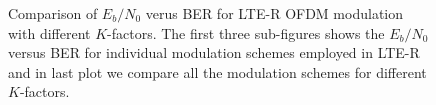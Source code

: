 \begin{figure}[t!]
  \begin{center}
  \hspace{1mm}
   \hspace{1mm}
  \hspace{1mm}
   \hspace{1mm}
     \caption{Comparison of $E_b/N_0$ verus BER for LTE-R OFDM modulation with different $K$-factors. The first three sub-figures shows the $E_b/N_0$ versus BER for individual modulation schemes employed in LTE-R and in last plot we compare all the modulation schemes for different $K$-factors.} 
\label{fig:modulation}      
   \end{center}
\end{figure}

